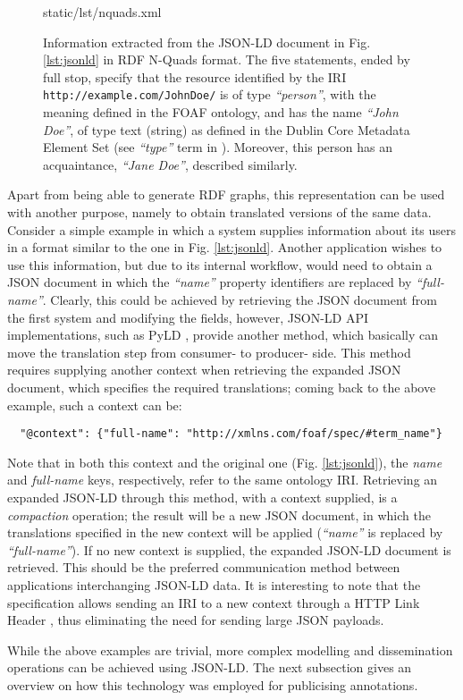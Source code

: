 \begin{figure}[!ht]
  
    {static/lst/nquads.xml}
    \caption[Information extracted from JSON-LD document in RDF N-Quads format]
            {Information extracted from the JSON-LD document in
             Fig. \ref{lst:jsonld} in RDF N-Quads format. The five statements,
             ended by full stop, specify that the resource identified by the IRI
             \texttt{http://example.com/JohnDoe/} is of type
             \textit{``person''}, with the meaning defined in the FOAF ontology,
             and has the name \textit{``John Doe''}, of type text (string) as
             defined in the Dublin Core Metadata Element Set (see
             \textit{``type''} term in \cite{ref:dc}). Moreover, this person has
             an acquaintance, \textit{``Jane Doe''}, described similarly.}
    \label{lst:nquads}
\end{figure}

Apart from being able to generate RDF graphs, this representation can be used
with another purpose, namely to obtain translated versions of the same data.
Consider a simple example in which a system supplies information about its
users in a format similar to the one in Fig. \ref{lst:jsonld}. Another
application wishes to use this information, but due to its internal workflow,
would need to obtain a JSON document in which the \textit{``name''} property
identifiers are replaced by \textit{``full-name''}.  Clearly, this could be
achieved by retrieving the JSON document from the first system and modifying
the fields, however, JSON-LD API implementations, such as PyLD \cite{ref:pyld},
provide another method, which basically can move the translation step from
consumer- to producer- side.  This method requires supplying another context
when retrieving the expanded JSON document, which specifies the required
translations; coming back to the above example, such a context can be:
\begin{verbatim}
  "@context": {"full-name": "http://xmlns.com/foaf/spec/#term_name"}
\end{verbatim}

Note that in both this context and the original one (Fig. \ref{lst:jsonld}),
the \textit{name} and \textit{full-name} keys, respectively, refer to the same
ontology IRI. Retrieving an expanded JSON-LD through this method, with a
context supplied, is a \textit{compaction} operation; the result will be a new
JSON document, in which the translations specified in the new context will be
applied (\textit{``name''} is replaced by \textit{``full-name''}). If no new
context is supplied, the expanded JSON-LD document is retrieved. This should be
the preferred communication method between applications interchanging JSON-LD
data. It is interesting to note that the specification allows sending an IRI to
a new context through a HTTP Link Header \cite{ref:rfc5988}, thus eliminating
the need for sending large JSON payloads.

While the above examples are trivial, more complex modelling and dissemination
operations can be achieved using JSON-LD. The next subsection gives an overview
on how this technology was employed for publicising annotations.

